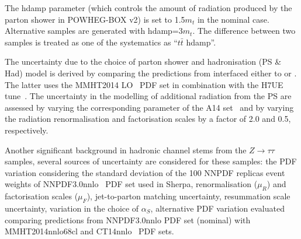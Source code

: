 The hdamp parameter (which controls the amount of radiation produced by the parton shower in
POWHEG-BOX v2) is set to 1.5$m_t$ in the nominal case. Alternative samples are generated with hdamp=3$m_t$. The
difference between two samples is treated as one of the systematics as ``$t\bar{t}$ hdamp''. 

The uncertainty due to the choice of parton shower and hadronisation (PS \& Had) model is derived 
by comparing the predictions from {\powheg} interfaced either to {\pythiaeight} or {}.
The latter uses the MMHT2014 LO~\cite{Harland-Lang:2014zoa} PDF set in combination with the H7UE tune~\cite{Bellm:2015jjp}.
The uncertainty in the modelling of additional radiation from the PS are assessed by
varying the corresponding parameter of the A14 set~\cite{ATL-PHYS-PUB-2016-004} and by varying the radiation renormalisation and factorisation scales
by a factor of 2.0 and 0.5, respectively. 


Another significant background in hadronic channel stems from the $Z\rightarrow \tau\tau$ samples, several sources of uncertainty are
considered for these samples: the PDF variation considering the standard deviation of the 100 NNPDF replicas event weights
of NNPDF3.0nnlo~\cite{Ball:2015NNPDF} PDF
set used in Sherpa, renormalisation ($\mu_{R}$) and factorisation scales ($\mu_{F}$), jet-to-parton matching uncertainty, resummation scale uncertainty,
variation in the choice of $\alpha_{S}$, alternative PDF variation evaluated comparing predictions from NNPDF3.0nnlo PDF set (nominal)
with MMHT2014nnlo68cl and CT14nnlo~\cite{Lai:2010vv,Gao:2013xoa} PDF sets.

